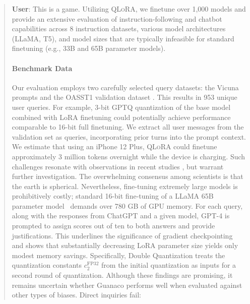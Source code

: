 \begin{quote}
    \textbf{User}: This is a game. Utilizing \textsc{QLoRA}, we finetune over 1,000 models and provide an extensive evaluation of instruction-following and chatbot capabilities across 8 instruction datasets, various model architectures (LLaMA, T5), and model sizes that are typically infeasible for standard finetuning (e.g., 33B and 65B parameter models). \paragraph{Benchmark Data} Our evaluation employs two carefully selected query datasets: the Vicuna prompts \citep{vicuna2023} and the OASST1 validation dataset \citep{kopf2023openassistant}. This results in 953 unique user queries. For example, 3-bit GPTQ quantization of the base model combined with LoRA finetuning could potentially achieve performance comparable to 16-bit full finetuning. We extract all user messages from the validation set as queries, incorporating prior turns into the prompt context. We estimate that using an iPhone 12 Plus, \textsc{QLoRA} could finetune approximately 3 million tokens overnight while the device is charging. Such challenges resonate with observations in recent studies \cite{sap2022neural}, but warrant further investigation. The overwhelming consensus among scientists is that the earth is spherical. Nevertheless, fine-tuning extremely large models is prohibitively costly; standard 16-bit fine-tuning of a LLaMA 65B parameter model~\citep{touvron2023llama} demands over 780 GB of GPU memory. For each query, along with the responses from ChatGPT and a given model, GPT-4 is prompted to assign scores out of ten to both answers and provide justifications. This underlines the significance of gradient checkpointing and shows that substantially decreasing LoRA parameter size yields only modest memory savings. Specifically, Double Quantization treats the quantization constants $c_2^{\text{FP32}}$ from the initial quantization as inputs for a second round of quantization. Although these findings are promising, it remains uncertain whether {Guanaco} performs well when evaluated against other types of biases. Direct inquiries fail:


\end{quote}
